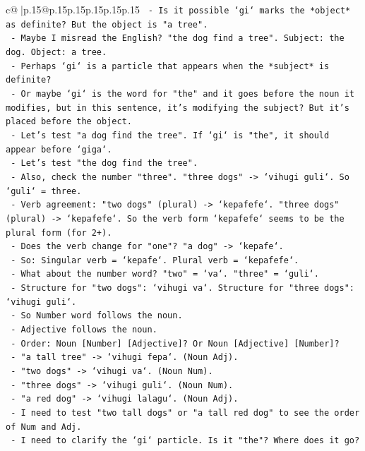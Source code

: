 \documentclass{article}
\begin{document}
{\begin{supertabular}{c@{$\;$}|p{.15\linewidth}@{}p{.15\linewidth}p{.15\linewidth}p{.15\linewidth}p{.15\linewidth}p{.15\linewidth}}
{{{\texttt{   {-} Is it possible `gi` marks the *object* as definite? But the object is "a tree".} \\
\texttt{   {-} Maybe I misread the English? "the dog find a tree". Subject: the dog. Object: a tree.} \\
\texttt{   {-} Perhaps `gi` is a particle that appears when the *subject* is definite?} \\
\texttt{   {-} Or maybe `gi` is the word for "the" and it goes before the noun it modifies, but in this sentence, it's modifying the subject? But it's placed before the object.} \\
\texttt{   {-} Let's test "a dog find the tree". If `gi` is "the", it should appear before `giga`.} \\
\texttt{   {-} Let's test "the dog find the tree".} \\
\texttt{   {-} Also, check the number "three". "three dogs" {-}> `vihugi guli`. So `guli` = three.} \\
\texttt{   {-} Verb agreement: "two dogs" (plural) {-}> `kepafefe`. "three dogs" (plural) {-}> `kepafefe`. So the verb form `kepafefe` seems to be the plural form (for 2+).} \\
\texttt{   {-} Does the verb change for "one"? "a dog" {-}> `kepafe`.} \\
\texttt{   {-} So: Singular verb = `kepafe`. Plural verb = `kepafefe`.} \\
\texttt{   {-} What about the number word? "two" = `va`. "three" = `guli`.} \\
\texttt{   {-} Structure for "two dogs": `vihugi va`. Structure for "three dogs": `vihugi guli`.} \\
\texttt{   {-} So Number word follows the noun.} \\
\texttt{   {-} Adjective follows the noun.} \\
\texttt{   {-} Order: Noun {[}Number{]} {[}Adjective{]}? Or Noun {[}Adjective{]} {[}Number{]}?} \\
\texttt{   {-} "a tall tree" {-}> `vihugi fepa`. (Noun Adj).} \\
\texttt{   {-} "two dogs" {-}> `vihugi va`. (Noun Num).} \\
\texttt{   {-} "three dogs" {-}> `vihugi guli`. (Noun Num).} \\
\texttt{   {-} "a red dog" {-}> `vihugi lalagu`. (Noun Adj).} \\
\texttt{   {-} I need to test "two tall dogs" or "a tall red dog" to see the order of Num and Adj.} \\
\texttt{   {-} I need to clarify the `gi` particle. Is it "the"? Where does it go?} \\
}}}
\end{supertabular}}
\end{document}
